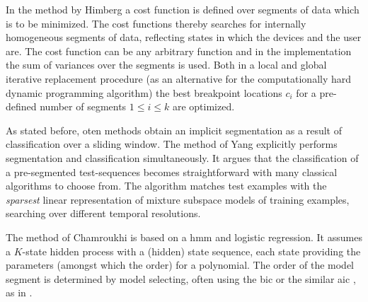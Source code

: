 In the method by Himberg \etal \cite{himberg2001time} a cost function is defined over segments of data which is to be minimized.
The cost functions thereby searches for internally homogeneous segments of data, reflecting states in which the devices and the user are.
The cost function can be any arbitrary function and in the implementation the sum of variances over the segments is used.
Both in a local and global iterative replacement procedure (as an alternative for the computationally hard dynamic programming algorithm) the best breakpoint locations $c_i$ for a pre-defined number of segments $1 \leq i \leq k$ are optimized.

As stated before, oten methods obtain an implicit segmentation as a result of classification over a sliding window.
The method of Yang \etal \cite{yang2008distributed} explicitly performs segmentation and classification simultaneously.
It argues that the classification of a pre-segmented test-sequences becomes straightforward with many classical algorithms to choose from.
The algorithm matches test examples with the \emph{sparsest} linear representation of mixture subspace models of training examples, searching over different temporal resolutions.

The method of Chamroukhi \etal \cite{chamroukhi2013joint} is based on a \gls{hmm} and logistic regression.
It assumes a $K$-state hidden process with a (hidden) state sequence, each state providing the parameters (amongst which the order) for a polynomial.
The order of the model segment is determined by model selecting, often using the \gls{bic} or the similar \gls{aic} \cite{akaike1974new}, as in \cite{he2008activity}.






